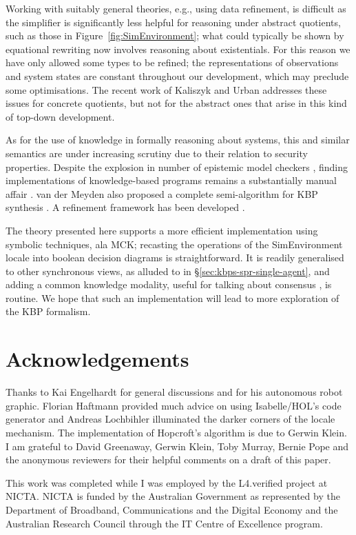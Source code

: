 \documentclass{llncs}
\newcommand{\isafun}[1]{{\sf #1}}
\begin{document}
Working with suitably general theories, e.g., using data refinement,
is difficult as the simplifier is significantly less helpful for
reasoning under abstract quotients, such as those in
Figure~\ref{fig:SimEnvironment}; what could typically be shown by
equational rewriting now involves reasoning about existentials.  For
this reason we have only allowed some types to be refined; the
representations of observations and system states are constant
throughout our development, which may preclude some optimisations. The
recent work of Kaliszyk and Urban \cite{Quotients:2011} addresses
these issues for concrete quotients, but not for the abstract ones
that arise in this kind of top-down development.

As for the use of knowledge in formally reasoning about systems, this
and similar semantics are under increasing scrutiny due to their
relation to security properties. Despite the explosion in number of
epistemic model checkers
\cite{vanEijck:DEMO:2005,DBLP:conf/cav/GammieM04,DBLP:journals/fuin/KacprzakNNPPSWZ08,DBLP:conf/cav/LomuscioQR09},
finding implementations of knowledge-based programs remains a
substantially manual affair \cite{Ron:2010}.  van der Meyden also
proposed a complete semi-algorithm for KBP synthesis
\cite{DBLP:conf/pricai/Meyden96}. A refinement framework has been
developed \cite{DBLP:conf/lpar/BickfordCHP04,EvdMM2000:FOSSACS}.

The theory presented here supports a more efficient implementation
using symbolic techniques, ala MCK; recasting the operations of the
\isafun{SimEnvironment} locale into boolean decision diagrams is
straightforward. It is readily generalised to other synchronous views,
as alluded to in \S\ref{sec:kbps-spr-single-agent}, and adding a
common knowledge modality, useful for talking about consensus
\cite[Chapter~6]{FHMV:1995}, is routine. We hope that such an
implementation will lead to more exploration of the KBP formalism.

\section{Acknowledgements}

Thanks to Kai Engelhardt for general discussions and for his
autonomous robot graphic. Florian Haftmann provided much advice on
using Isabelle/HOL's code generator and Andreas Lochbihler illuminated
the darker corners of the locale mechanism. The implementation of
Hopcroft's algorithm is due to Gerwin Klein. I am grateful to David
Greenaway, Gerwin Klein, Toby Murray, Bernie Pope and the anonymous
reviewers for their helpful comments on a draft of this paper.

This work was completed while I was employed by the L4.verified
project at NICTA. NICTA is funded by the Australian Government as
represented by the Department of Broadband, Communications and the
Digital Economy and the Australian Research Council through the IT
Centre of Excellence program.



\end{document}
